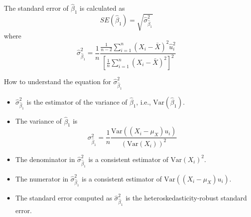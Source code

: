 \documentclass[presentation]{beamer}
\begin{document}
\begin{frame}[label={sec:orgb5465a5}]{The standard error of \(\hat{\beta}_1\) is calculated as}
\begin{equation}
\label{eq:se-b-1}
SE(\hat{\beta}_1) = \sqrt{\hat{\sigma}^2_{\hat{\beta}_1}}
\end{equation}
where
\begin{equation}
\label{eq:sigma-b-1}
\hat{\sigma}^2_{\hat{\beta}_1} = \frac{1}{n} \frac{\frac{1}{n-2} \sum_{i=1}^n (X_i - \bar{X})^2 \hat{u}^2_i}{\left[ \frac{1}{n} \sum_{i=1}^n (X_i - \bar{X})^2 \right]^2}
\end{equation}
\end{frame}

\begin{frame}[label={sec:org5171fb1}]{How to understand the equation for \(\hat{\sigma}^2_{\hat{\beta}_1}\)}
\begin{itemize}
\item \(\hat{\sigma}^2_{\hat{\beta}_1}\) is the estimator of the variance of
\(\hat{\beta}_1\), i.e., \(\mathrm{Var}(\hat{\beta}_1)\).

\item The variance of \(\hat{\beta}_1\) is 
\[ \sigma^2_{\hat{\beta}_1} = \frac{1}{n} \frac{\mathrm{Var}\left( (X_i - \mu_X)u_i \right)}{\left( \mathrm{Var}(X_i) \right)^2} \]

\item The denominator in \(\hat{\sigma}^2_{\hat{\beta}_1}\) is a consistent
estimator of \(\mathrm{Var}(X_i)^2\).

\item The numerator in \(\hat{\sigma}^2_{\hat{\beta}_1}\) is a consistent
estimator of \(\mathrm{Var}((X_i - \mu_X)u_i)\).

\item The standard error computed as \(\hat{\sigma}^2_{\hat{\beta}_1}\) is
the \alert{heteroskedasticity-robust standard error}.
\end{itemize}
\end{frame}
\end{document}

